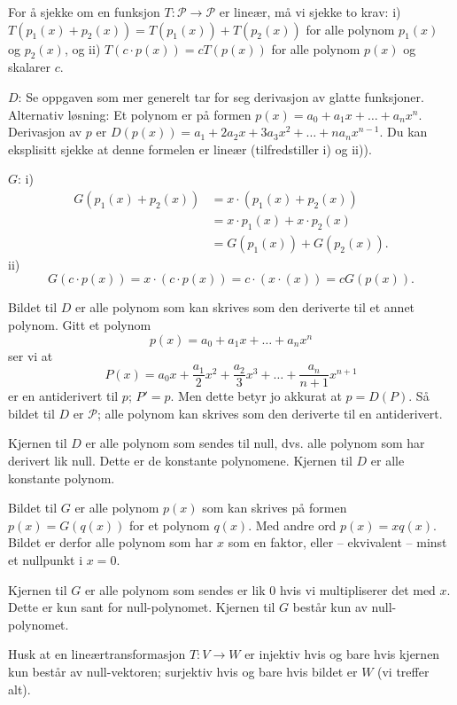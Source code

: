 \begin{losning}
\begin{punkt}
For å sjekke om en funksjon $T:\mathcal{P}\rightarrow \mathcal{P}$ er lineær, må vi sjekke to krav: i) $T(p_1(x)+p_2(x))=T(p_1(x))+T(p_2(x))$ for alle polynom $p_1(x)$ og $p_2(x)$, og ii) $T(c\cdot p(x))=cT(p(x))$ for alle polynom $p(x)$ og skalarer $c$.


\noindent
$D$: Se oppgaven som mer generelt tar for seg derivasjon av glatte funksjoner. Alternativ løsning: Et polynom er på formen $p(x)=a_0+a_1x+\dots +a_nx^n$. Derivasjon av $p$ er $D(p(x))=a_1+2a_2x+3a_3x^2+\dots+na_nx^{n-1}$. Du kan eksplisitt sjekke at denne formelen er lineær (tilfredstiller i) og ii)).


\noindent
$G$: i)
\begin{align*}
G(p_1(x)+p_2(x))
&=x\cdot(p_1(x)+p_2(x)) \\
&=x\cdot p_1(x)+x\cdot p_2(x) \\
&=G(p_1(x))+G(p_2(x)).
\end{align*}
ii) $$G(c\cdot p(x))=x\cdot(c\cdot p(x))=c\cdot(x\cdotp(x))=cG(p(x)).$$


\end{punkt}
Bildet til $D$ er alle polynom som kan skrives som den deriverte til et annet polynom. Gitt et polynom $$p(x)=a_0+a_1x+\dots+a_nx^n$$ ser vi at $$P(x)=a_0x+\frac{a_1}{2}x^2+\frac{a_2}{3}x^3+\dots +\frac{a_n}{n+1}x^{n+1}$$ er en antiderivert til $p$; $P'=p$. Men dette betyr jo akkurat at $p=D(P)$. Så bildet til $D$ er $\mathcal{P}$; alle polynom kan skrives som den deriverte til en antiderivert.


\noindent
Kjernen til $D$ er alle polynom som sendes til null, dvs. alle polynom som har derivert lik null. Dette er de konstante polynomene. Kjernen til $D$ er alle konstante polynom.


\begin{punkt}
Bildet til $G$ er alle polynom $p(x)$ som kan skrives på formen $p(x)=G(q(x))$ for et polynom $q(x)$. Med andre ord $p(x)=xq(x)$. Bildet er derfor alle polynom som har $x$ som en faktor, eller -- ekvivalent -- minst et nullpunkt i $x=0$. 


\noindent
Kjernen til $G$ er alle polynom som sendes er lik $0$ hvis vi multipliserer det med $x$. Dette er kun sant for null-polynomet. Kjernen til $G$ består kun av null-polynomet.



\end{punkt}

\begin{punkt}
Husk at en lineærtransformasjon $T:V\rightarrow W$ er injektiv hvis og bare hvis kjernen kun består av null-vektoren; surjektiv hvis og bare hvis bildet er $W$ (vi treffer alt).


\end{punkt}
\end{losning}
